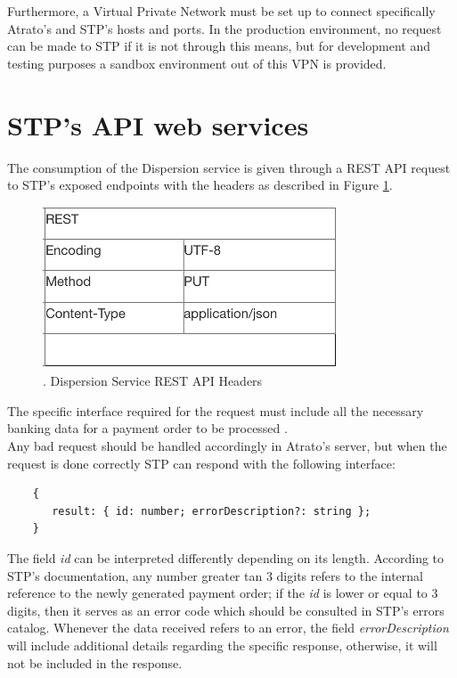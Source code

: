 Furthermore, a Virtual Private Network must be set up to connect specifically Atrato’s and STP’s hosts and ports. In the production environment, no request can be made to STP if it is not through this means, but for development and testing purposes a sandbox environment out of this VPN is provided.

\section{STP’s API web services}

The consumption of the Dispersion service is given through a REST API request to STP’s exposed endpoints with the headers as described in Figure \ref{fig:STPRequestParams}.

\begin{figure} [h!]
    \centering
    \includegraphics[scale = 1]{assets/diagrams/STPRequestParams.png}
    \caption{. Dispersion Service REST API Headers}\label{fig:STPRequestParams}
\end{figure}

The specific interface required for the request must include all the necessary banking data for a payment order to be processed \cite{stp}.\\

Any bad request should be handled accordingly in Atrato’s server, but when the request is done correctly STP can respond with the following interface:

\begin{verbatim}
    {
       result: { id: number; errorDescription?: string }; 
    }
\end{verbatim}
  
The field \textit{id} can be interpreted differently depending on its length. According to STP’s documentation, any number greater tan 3 digits refers to the internal reference to the newly generated payment order; if the \textit{id} is lower or equal to 3 digits, then it serves as an error code which should be consulted in STP’s errors catalog. Whenever the data received refers to an error, the field \textit{errorDescription} will include additional details regarding the specific response, otherwise, it will not be included in the response.\\

